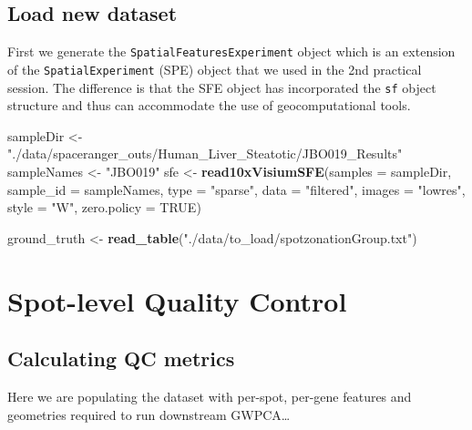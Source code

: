 \documentclass[
]{book}
\newenvironment{Shaded}{\begin{snugshade}}{\end{snugshade}}
\newcommand{\AttributeTok}[1]{\textcolor[rgb]{0.13,0.29,0.53}{#1}}
\newcommand{\ConstantTok}[1]{\textcolor[rgb]{0.56,0.35,0.01}{#1}}
\newcommand{\FunctionTok}[1]{\textcolor[rgb]{0.13,0.29,0.53}{\textbf{#1}}}
\newcommand{\NormalTok}[1]{#1}
\newcommand{\OtherTok}[1]{\textcolor[rgb]{0.56,0.35,0.01}{#1}}
\newcommand{\StringTok}[1]{\textcolor[rgb]{0.31,0.60,0.02}{#1}}
\begin{document}
\hypertarget{load-new-dataset}{%
\subsection{Load new dataset}\label{load-new-dataset}}

First we generate the \texttt{SpatialFeaturesExperiment} object which is an extension of the \texttt{SpatialExperiment} (SPE) object that we used in the 2nd practical session. The difference is that the SFE object has incorporated the \texttt{sf} object structure and thus can accommodate the use of geocomputational tools.

\begin{Shaded}
\begin{Highlighting}[]
\NormalTok{sampleDir }\OtherTok{\textless{}{-}} \StringTok{"./data/spaceranger\_outs/Human\_Liver\_Steatotic/JBO019\_Results"}
\NormalTok{sampleNames }\OtherTok{\textless{}{-}} \StringTok{"JBO019"}
\NormalTok{sfe }\OtherTok{\textless{}{-}} \FunctionTok{read10xVisiumSFE}\NormalTok{(}\AttributeTok{samples =}\NormalTok{ sampleDir, }
                        \AttributeTok{sample\_id =}\NormalTok{ sampleNames, }
                        \AttributeTok{type =} \StringTok{"sparse"}\NormalTok{, }
                        \AttributeTok{data =} \StringTok{"filtered"}\NormalTok{, }
                        \AttributeTok{images =} \StringTok{"lowres"}\NormalTok{, }
                        \AttributeTok{style =} \StringTok{"W"}\NormalTok{, }
                        \AttributeTok{zero.policy =} \ConstantTok{TRUE}\NormalTok{)}

\NormalTok{ground\_truth }\OtherTok{\textless{}{-}} \FunctionTok{read\_table}\NormalTok{(}\StringTok{"./data/to\_load/spotzonationGroup.txt"}\NormalTok{)}
\end{Highlighting}
\end{Shaded}

\hypertarget{spot-level-quality-control-1}{%
\section{Spot-level Quality Control}\label{spot-level-quality-control-1}}

\hypertarget{calculating-qc-metrics-1}{%
\subsection{Calculating QC metrics}\label{calculating-qc-metrics-1}}

Here we are populating the dataset with per-spot, per-gene features and geometries required to run downstream GWPCA\ldots{}
\end{document}
